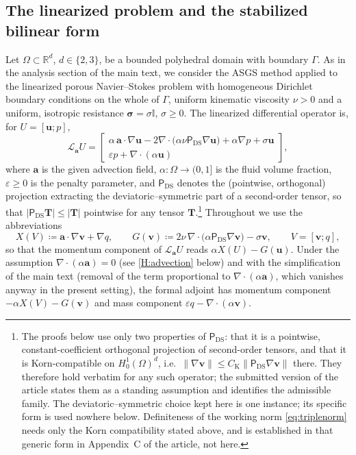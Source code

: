 \documentclass[11pt,a4paper]{article}
\newcommand{\bu}{\boldsymbol{u}}
\newcommand{\bv}{\boldsymbol{v}}
\newcommand{\ba}{\boldsymbol{a}}
\newcommand{\ViscProj}{\mathsf{P}_{\mathrm{DS}}}
\newcommand{\X}{X}
\theoremstyle{plain}
\theoremstyle{remark}
\theoremstyle{definition}
\numberwithin{equation}{section}
\begin{document}
\subsection{The linearized problem and the stabilized bilinear form}
Let $\Omega\subset\mathbb{R}^d$, $d\in\{2,3\}$, be a bounded polyhedral domain with
boundary $\Gamma$. As in the analysis section of the main text, we consider the ASGS
method applied to the linearized porous Navier--Stokes problem with homogeneous Dirichlet
boundary conditions on the whole of $\Gamma$, uniform kinematic viscosity $\nu>0$ and a
uniform, isotropic resistance $\boldsymbol{\sigma}=\sigma\mathbb{I}$, $\sigma\ge 0$. The
linearized differential operator is, for $U=[\bu;p]$,
\begin{equation}\label{eq:strongop}
  \mathcal{L}_{\ba} U
  = \begin{bmatrix}
      \alpha\,\ba\cdot\nabla\bu
      - 2\nabla\cdot\bigl(\alpha\nu\ViscProj\nabla\bu\bigr)
      + \alpha\nabla p + \sigma\bu \\[2pt]
      \varepsilon p + \nabla\cdot(\alpha\bu)
    \end{bmatrix},
\end{equation}
where $\ba$ is the given advection field, $\alpha:\Omega\to(0,1]$ is the fluid volume
fraction, $\varepsilon\ge 0$ is the penalty parameter, and $\ViscProj$ denotes the
(pointwise, orthogonal) projection extracting the deviatoric--symmetric part of a
second-order tensor, so that $\bigl|\ViscProj \mathbf{T}\bigr|\le|\mathbf{T}|$ pointwise
for any tensor $\mathbf{T}$.\footnote{The proofs below use only two properties of
$\ViscProj$: that it is a pointwise, constant-coefficient orthogonal projection of
second-order tensors, and that it is Korn-compatible on $H^1_0(\Omega)^d$, i.e.\
$\lVert\nabla\bv\rVert\le C_{\mathrm{K}}\lVert\ViscProj\nabla\bv\rVert$ there. They therefore
hold verbatim for any such operator; the submitted version of the article states them as a
standing assumption and identifies the admissible family. The deviatoric--symmetric choice
kept here is one instance; its specific form is used nowhere below. Definiteness of the
working norm \eqref{eq:triplenorm} needs only the Korn compatibility stated above, and is
established in that generic form in Appendix~C of the article, not here.} Throughout we use the abbreviations
\begin{equation}\label{eq:XG}
  \X(V) \coloneqq \ba\cdot\nabla\bv + \nabla q,
  \qquad
  G(\bv) \coloneqq 2\nu\,\nabla\cdot\bigl(\alpha\ViscProj\nabla\bv\bigr) - \sigma\bv,
  \qquad V=[\bv;q],
\end{equation}
so that the momentum component of $\mathcal{L}_{\ba}U$ reads
$\alpha \X(U)-G(\bu)$. Under the assumption $\nabla\cdot(\alpha\ba)=0$ (see \cref{H:advection} below) and
with the simplification of the main text (removal of the term proportional to
$\nabla\cdot(\alpha\ba)$, which vanishes anyway in the present setting), the formal adjoint
has momentum component $-\alpha\X(V)-G(\bv)$ and mass component
$\varepsilon q - \nabla\cdot(\alpha\bv)$.
\end{document}
